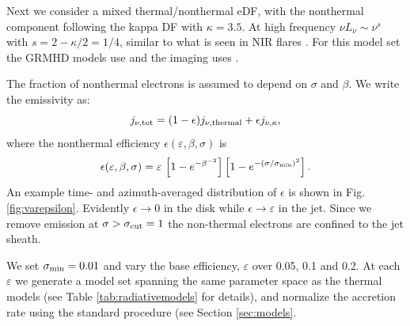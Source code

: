 Next we consider a mixed thermal/nonthermal eDF, with the nonthermal component following the kappa DF with $\kappa = 3.5$.  At high frequency $\nu L_\nu \sim \nu^s$ with $s = 2 - \kappa/2 = 1/4$, similar to what is seen in NIR flares \citep{2007ApJ...667..900H}.  For this model set the GRMHD models use \bhac and the imaging uses \bhoss.

The fraction of nonthermal electrons is assumed to depend on $\sigma$ and $\beta$.  We write the emissivity as:
\begin{equation}
j_{\nu,\rm{tot}}=(1-\epsilon) j_{\nu,\rm{thermal}} + \epsilon j_{\nu, \kappa},
\label{eq:kappaeff}
\end{equation}
where the nonthermal efficiency $\epsilon( \varepsilon, \beta, \sigma)$ is
\begin{equation}
    \epsilon(\varepsilon,\beta,\sigma)=\varepsilon\,
    \left[1 - e^{-\beta^{-2}}\right]
    \left[1-e^{-(\sigma/\sigma_{\rm min})^2}\right].
    \label{eq:efficiencybetasigma}
\end{equation}
An example time- and azimuth-averaged distribution of $\epsilon$ is shown in Fig. \ref{fig:varepsilon}.  Evidently $\epsilon \rightarrow 0$ in the disk while $\epsilon \rightarrow \varepsilon$ in the jet.  Since we remove emission at $\sigma > \sigma_{\rm cut} = 1$ the non-thermal electrons are confined to the jet sheath.

We set $\sigma_{\rm min}=0.01$ and vary the base efficiency, $\varepsilon$ over 0.05, 0.1 and 0.2.  At each $\varepsilon$ we generate a model set spanning the same parameter space as the thermal models (see Table \ref{tab:radiativemodels} for details),
and normalize the accretion rate using the standard procedure (see Section \ref{sec:models}.


